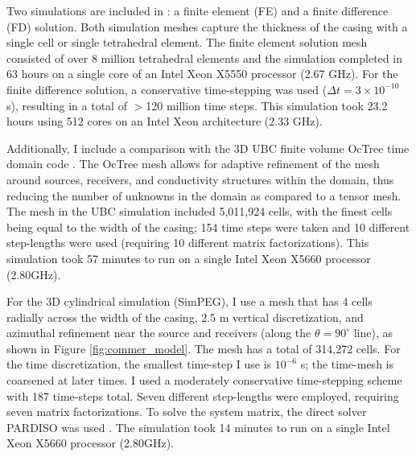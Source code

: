 Two simulations are included in \cite{Commer2015}: a finite element (FE) and a finite difference (FD) solution. Both simulation meshes capture the thickness of the casing with a single cell or single tetrahedral element. The finite element solution mesh consisted of over 8 million tetrahedral elements and the simulation completed in 63 hours on a single core of an Intel Xeon X5550 processor (2.67 GHz). For the finite difference solution, a conservative time-stepping was used ($\Delta t = 3 \times 10^{-10}$ s), resulting in a total of $>$120 million time steps. This simulation took 23.2 hours using 512 cores on an Intel Xeon architecture (2.33 GHz).

Additionally, I include a comparison with the 3D UBC finite volume OcTree time domain code \citep{Haber2007}. The OcTree mesh allows for adaptive refinement of the mesh around sources, receivers, and conductivity structures within the domain, thus reducing the number of unknowns in the domain as compared to a tensor mesh. The mesh in the UBC simulation included 5,011,924 cells, with the finest cells being equal to the width of the casing; 154 time steps were taken and 10 different step-lengths were used (requiring 10 different matrix factorizations). This simulation took 57 minutes to run on a single Intel Xeon X5660 processor (2.80GHz).

For the 3D cylindrical simulation (SimPEG), I use a mesh that has 4 cells radially across the width of the casing, 2.5 m vertical discretization, and azimuthal refinement near the source and receivers (along the $\theta=90^\circ$ line), as shown in Figure \ref{fig:commer_model}. The mesh has a total of 314,272 cells. For the time discretization, the smallest time-step I use is $10^{-6}$ s; the time-mesh is coarsened at later times. I used a moderately conservative time-stepping scheme with 187 time-steps total. Seven different step-lengths were employed, requiring seven matrix factorizations. To solve the system matrix, the direct solver PARDISO was used \citep{Petra2014, Cosmin2016}. The simulation took 14 minutes to run on a single Intel Xeon X5660 processor (2.80GHz).






